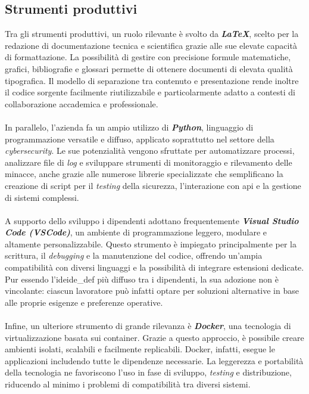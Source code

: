 \subsection{Strumenti produttivi}  
Tra gli strumenti produttivi, un ruolo rilevante è svolto da \textbf{\textit{LaTeX}}, scelto per la redazione di documentazione tecnica e scientifica grazie alle sue elevate capacità di formattazione. La possibilità di gestire con precisione formule matematiche, grafici, bibliografie e glossari permette di ottenere documenti di elevata qualità tipografica. Il modello di separazione tra contenuto e presentazione rende inoltre il codice sorgente facilmente riutilizzabile e particolarmente adatto a contesti di collaborazione accademica e professionale.\\\\  
In parallelo, l'azienda fa un ampio utilizzo di \textbf{\textit{Python}}, linguaggio di programmazione versatile e diffuso, applicato soprattutto nel settore della \textit{cybersecurity}. Le sue potenzialità vengono sfruttate per automatizzare processi, analizzare file di \textit{log} e sviluppare strumenti di monitoraggio e rilevamento delle minacce, anche grazie alle numerose librerie specializzate che semplificano la creazione di script per il \textit{testing} della sicurezza, l'interazione con \gls{api} e la gestione di sistemi complessi.\\\\  
A supporto dello sviluppo i dipendenti adottano frequentemente \textbf{\textit{Visual Studio Code (VSCode)}}, un ambiente di programmazione leggero, modulare e altamente personalizzabile. Questo strumento è impiegato principalmente per la scrittura, il \textit{debugging} e la manutenzione del codice, offrendo un'ampia compatibilità con diversi linguaggi e la possibilità di integrare estensioni dedicate. Pur essendo l'\gls{ide}\gls{ide_def} più diffuso tra i dipendenti, la sua adozione non è vincolante: ciascun lavoratore può infatti optare per soluzioni alternative in base alle proprie esigenze e preferenze operative.\\\\  
Infine, un ulteriore strumento di grande rilevanza è \textbf{\textit{Docker}}, una tecnologia di virtualizzazione basata sui \gls{container}. Grazie a questo approccio, è possibile creare ambienti isolati, scalabili e facilmente replicabili. Docker, infatti, esegue le applicazioni includendo tutte le dipendenze necessarie. La leggerezza e portabilità della tecnologia ne favoriscono l'uso in fase di sviluppo, \textit{testing} e distribuzione, riducendo al minimo i problemi di compatibilità tra diversi sistemi.  
